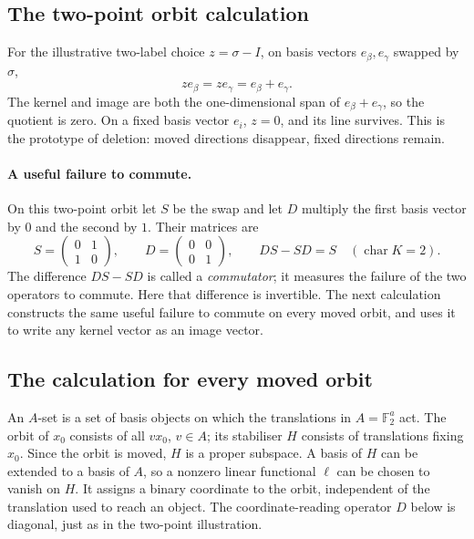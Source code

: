 \documentclass[11pt,a4paper,oneside,openany]{book}
\theoremstyle{definition}\newtheorem{definition}[theorem]{Definition}
\theoremstyle{remark}\newtheorem{remark}[theorem]{Remark}
\numberwithin{equation}{chapter}
\begin{document}
\subsection{The two-point orbit calculation}
For the illustrative two-label choice $z=\sigma-I$, on basis vectors $e_\beta,e_\gamma$ swapped by $\sigma$,
\[ze_\beta=ze_\gamma=e_\beta+e_\gamma.\]
The kernel and image are both the one-dimensional span of $e_\beta+e_\gamma$, so the quotient is zero. On a fixed basis vector $e_i$, $z=0$, and its line survives. This is the prototype of deletion: moved directions disappear, fixed directions remain.

\paragraph*{A useful failure to commute.}
On this two-point orbit let $S$ be the swap and let $D$ multiply
the first basis vector by $0$ and the second by $1$. Their matrices
are
\[
 S=\begin{pmatrix}0&1\\1&0\end{pmatrix},\qquad
 D=\begin{pmatrix}0&0\\0&1\end{pmatrix},\qquad DS-SD=S
 \quad(\operatorname{char}K=2).
\]
The difference $DS-SD$ is called a \emph{commutator}; it measures
the failure of the two operators to commute. Here that difference
is invertible. The next calculation constructs the same useful
failure to commute on every moved orbit, and uses it to write any
kernel vector as an image vector.

\subsection{The calculation for every moved orbit}
An $A$-set is a set of basis objects on which the translations in
$A=\mathbb F_2^a$ act. The orbit of $x_0$ consists of all $v x_0$,
$v\in A$; its stabiliser $H$ consists of translations fixing $x_0$.
Since the orbit is moved, $H$ is a proper subspace. A basis of $H$
can be extended to a basis of $A$, so a nonzero linear functional
$\ell$ can be chosen to vanish on $H$. It assigns a binary coordinate
to the orbit, independent of the translation used to reach an object.
The coordinate-reading operator $D$ below is diagonal, just as in
the two-point illustration.
\end{document}
